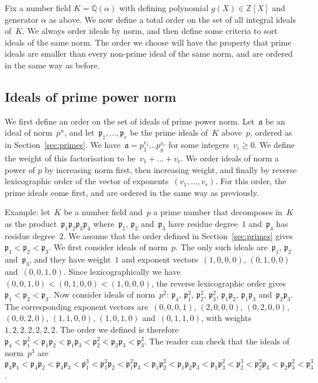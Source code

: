 \documentclass{article}
\def\Z{{\mathbb Z}}
\def\Q{{\mathbb Q}}
\def\a{{\mathfrak a}}
\def\p{{\mathfrak p}}
\begin{document}
Fix a number field $K=\Q(\alpha)$ with defining polynomial
$g(X)\in\Z[X]$ and generator $\alpha$ as above. 
We now define a total order on the set of all integral ideals of~$K$.
We always order ideals by norm, and then define some criteria to sort ideals of
the same norm. The order we choose will have the property that prime ideals are
smaller than every non-prime ideal of the same norm, and are ordered in the same
way as before.

\subsection{Ideals of prime power norm}\label{sec:primepowernorm}

We first define an order on the set of ideals of prime power norm. Let~$\a$ be
an ideal of norm~$p^n$, and let~$\p_1,\dots,\p_r$ be the prime ideals of~$K$
above~$p$, ordered as in Section~\ref{sec:primes}. We have~$\a = p_1^{v_1}\dots
p_g^{v_r}$ for some integers~$v_i\ge 0$. We define the weight of this
factorisation to be~$v_1+\dots+v_r$. We order ideals of norm a power of $p$ by
increasing norm first, then increasing weight, and finally by reverse
lexicographic order of the vector of exponents~$(v_1,\dots,v_r)$. For this
order, the prime ideals come first, and are ordered in the same way as
previously.

Example: let~$K$ be a number field and~$p$ a prime number that decomposes in~$K$
as the product~$\p_1\p_2\p_3\p_4$ where~$\p_1$, $\p_2$ and~$\p_3$ have residue
degree~$1$ and~$\p_4$ has residue degree~$2$. We assume that the order defined
in Section~\ref{sec:primes} gives~$\p_1 < \p_2 < \p_3$. We first consider ideals
of norm~$p$. The only such ideals are~$\p_1$, $\p_2$ and~$\p_3$, and they have weight~$1$
and exponent vectors~$(1,0,0,0)$, $(0,1,0,0)$ and~$(0,0,1,0)$. Since
lexicographically we have~$(0,0,1,0)<(0,1,0,0)<(1,0,0,0)$, the reverse
lexicographic order gives~$\p_1<\p_2<\p_3$. Now
consider ideals of norm~$p^2$: $\p_4$, $\p_1^2$, $\p_2^2$, $\p_3^2$, $\p_1\p_2$,
$\p_1\p_3$ and~$\p_2\p_3$. The corresponding exponent vectors are~$(0,0,0,1)$,
$(2,0,0,0)$, $(0,2,0,0)$, $(0,0,2,0)$, $(1,1,0,0)$, $(1,0,1,0)$ and~$(0,1,1,0)$,
with weights~$1,2,2,2,2,2,2$. The order we defined is therefore~$\p_4 < \p_1^2 <
\p_1\p_2 < \p_1\p_3 < \p_2^2 < \p_2\p_3 < \p_3^2$. The reader can check that the
ideals of norm~$p^3$ are~$\p_4\p_1 < \p_4\p_2 < \p_4\p_3 < \p_1^3 < \p_1^2\p_2 <
\p_1^2\p_3 < \p_1\p_2^2 < \p_1\p_2\p_3 < \p_1\p_3^2 < \p_2^3 < \p_2^2\p_3 <
\p_2\p_3^2 < \p_3^3$.
\end{document}
